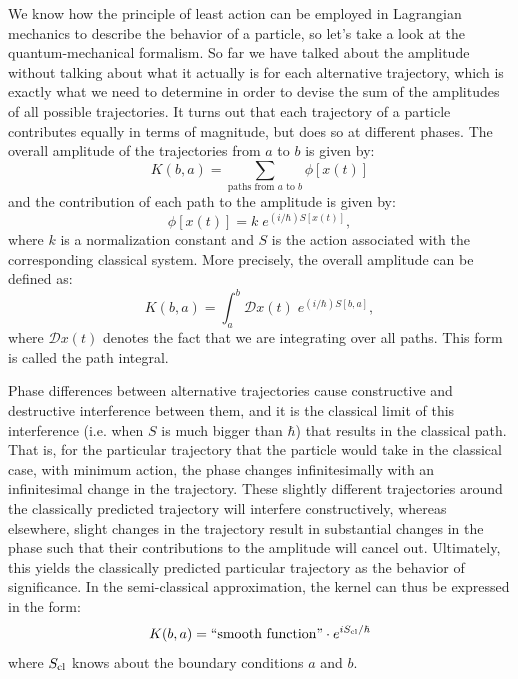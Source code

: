 \documentclass[12pt]{revtex4}
\begin{document}
We know how the principle of least action can be employed in Lagrangian mechanics to describe the behavior of a particle, so let's take a look at the quantum-mechanical formalism. So far we have talked about the amplitude without talking about what it actually is for each alternative trajectory, which is exactly what we need to determine in order to devise the sum of the amplitudes of all possible trajectories. It turns out that each trajectory of a particle contributes equally in terms of magnitude, but does so at different phases. The overall amplitude of the trajectories from $a$ to $b$ is given by:
\[ K(b,a) = \sum_{\text{paths from $a$ to $b$}} \phi [x(t)] \]
and the contribution of each path to the amplitude is given by:
\[ \phi [x(t)] = k \; e^{(i/\hbar)S[x(t)]}, \]
where $k$ is a normalization constant and $S$ is the action associated with the corresponding classical system. More precisely, the overall amplitude can be defined as:
\[ K(b,a) = \int_{a}^{b}\mathcal{D}x(t) \; e^{(i/\hbar)S[b, a]} , \]
where $\mathcal{D}x(t)$ denotes the fact that we are integrating over all paths. This form is called the path integral.

Phase differences between alternative trajectories cause constructive and destructive interference between them, and it is the classical limit of this interference (i.e. when $S$ is much bigger than $\hbar$) that results in the classical path. That is, for the particular trajectory that the particle would take in the classical case, with minimum action, the phase changes infinitesimally with an infinitesimal change in the trajectory. These slightly different trajectories around the classically predicted trajectory will interfere constructively, whereas elsewhere, slight changes in the trajectory result in substantial changes in the phase such that their contributions to the amplitude will cancel out. Ultimately, this yields the classically predicted particular trajectory as the behavior of significance. In the semi-classical approximation, the kernel can thus be expressed in the form:
\begin{equation} \label{sckernel}
K(b,a)=\text{``smooth function''}\cdot e^{iS_{\rm cl}/\hbar}
\end{equation} 
where $S_{\rm cl}$ knows about the boundary conditions $a$ and $b$.
\end{document}
